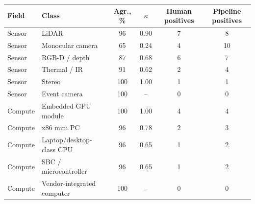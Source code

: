 \begin{tabularx}{\textwidth}{llCCCC}
\toprule
\textbf{Field} & \textbf{Class} & \textbf{Agr., \%} & \textbf{$\kappa$} & \textbf{Human positives} & \textbf{Pipeline positives}\\
\midrule
Sensor & LiDAR & 96 & 0.90 & 7 & 8\\
Sensor & Monocular camera & 65 & 0.24 & 4 & 10\\
Sensor & RGB-D / depth & 87 & 0.68 & 6 & 7\\
Sensor & Thermal / IR & 91 & 0.62 & 2 & 4\\
Sensor & Stereo & 100 & 1.00 & 1 & 1\\
Sensor & Event camera & 100 & -- & 0 & 0\\
Compute & Embedded GPU module & 100 & 1.00 & 4 & 4\\
Compute & x86 mini PC & 96 & 0.78 & 2 & 3\\
Compute & Laptop/desktop-class CPU & 96 & 0.65 & 1 & 2\\
Compute & SBC / microcontroller & 96 & 0.65 & 1 & 2\\
Compute & Vendor-integrated computer & 100 & -- & 0 & 0\\
\bottomrule
\end{tabularx}
